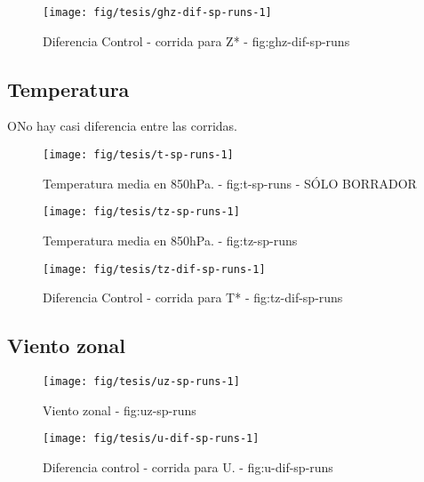 \documentclass[spanish,a4paper]{book}
\begin{document}
\begin{figure*}
\texttt{[image: fig/tesis/ghz-dif-sp-runs-1]} \caption{Diferencia Control - corrida para Z* - fig:ghz-dif-sp-runs}\label{fig:ghz-dif-sp-runs}
\end{figure*}

\subsection{Temperatura}\label{temperatura-2}

ONo hay casi diferencia entre las corridas.

\begin{figure*}
\texttt{[image: fig/tesis/t-sp-runs-1]} \caption{Temperatura media en 850hPa. - fig:t-sp-runs - SÓLO BORRADOR}\label{fig:t-sp-runs}
\end{figure*}

\begin{figure*}
\texttt{[image: fig/tesis/tz-sp-runs-1]} \caption{Temperatura media en 850hPa. - fig:tz-sp-runs}\label{fig:tz-sp-runs}
\end{figure*}

\begin{landscape}\begin{figure}

{\centering \texttt{[image: fig/tesis/tz-dif-sp-runs-1]} 

}

\caption{Diferencia Control - corrida para T* - fig:tz-dif-sp-runs}\label{fig:tz-dif-sp-runs}
\end{figure}
\end{landscape}

\subsection{Viento zonal}\label{viento-zonal-2}

\begin{landscape}\begin{figure}

{\centering \texttt{[image: fig/tesis/uz-sp-runs-1]} 

}

\caption{Viento zonal - fig:uz-sp-runs}\label{fig:uz-sp-runs}
\end{figure}
\end{landscape}

\begin{figure*}
\texttt{[image: fig/tesis/u-dif-sp-runs-1]} \caption{Diferencia control - corrida para U. - fig:u-dif-sp-runs}\label{fig:u-dif-sp-runs}
\end{figure*}
\end{document}
